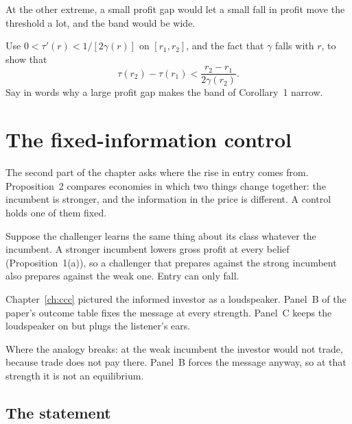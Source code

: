 At the other extreme, a small profit gap would let a small fall in profit move the threshold a lot, and the band
would be wide.

\begin{checkyourself}
\label{q:example-width}
Use \(0<\tau'(r)<1/[2\gamma(r)]\) on \([r_1,r_2]\), and the fact that \(\gamma\) falls with \(r\), to show that
\[
\tau(r_2)-\tau(r_1)<\frac{r_2-r_1}{2\gamma(r_2)} .
\]
Say in words why a large profit gap makes the band of Corollary~1 narrow.
\end{checkyourself}

\section{The fixed-information control}\label{sec:example-control}

The second part of the chapter asks where the rise in entry comes from. Proposition~2 compares economies in which
two things change together: the incumbent is stronger, and the information in the price is different. A control
holds one of them fixed.

\begin{intuition}
Suppose the challenger learns the same thing about its class whatever the incumbent. A stronger incumbent lowers
gross profit at every belief (Proposition~1(a)), so a challenger that prepares against the strong incumbent also
prepares against the weak one. Entry can only fall.
\end{intuition}

\begin{analogy}
Chapter~\ref{ch:ccc} pictured the informed investor as a loudspeaker. Panel~B of the paper's outcome table fixes the
message at every strength. Panel~C keeps the loudspeaker on but plugs the listener's ears.

Where the analogy breaks: at the weak incumbent the investor would not trade, because trade does not pay there.
Panel~B forces the message anyway, so at that strength it is not an equilibrium.
\end{analogy}

\subsection{The statement}


